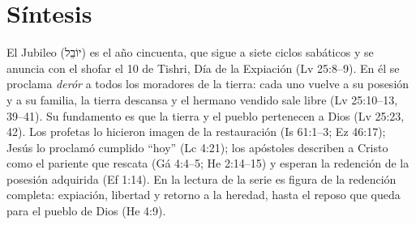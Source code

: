 \documentclass[11pt,letterpaper]{article}
\newcommand{\heb}[1]{\mbox{\foreignlanguage{hebrew}{#1}}}
\begin{document}
\section{Síntesis}

\begin{tcolorbox}[enhanced,unbreakable,colback=papiro,colframe=tierraroja,boxrule=1pt,arc=3pt,title={El Jubileo},fonttitle=\bfseries,coltitle=papiro,colbacktitle=tierraroja]
El Jubileo (\heb{יוֹבֵל}) es el año cincuenta, que sigue a siete ciclos sabáticos y se anuncia con el shofar el 10 de Tishri, Día de la Expiación (Lv 25:8--9). En él se proclama \emph{derór} a todos los moradores de la tierra: cada uno vuelve a su posesión y a su familia, la tierra descansa y el hermano vendido sale libre (Lv 25:10--13, 39--41). Su fundamento es que la tierra y el pueblo pertenecen a Dios (Lv 25:23, 42). Los profetas lo hicieron imagen de la restauración (Is 61:1--3; Ez 46:17); Jesús lo proclamó cumplido ``hoy'' (Lc 4:21); los apóstoles describen a Cristo como el pariente que rescata (Gá 4:4--5; He 2:14--15) y esperan la redención de la posesión adquirida (Ef 1:14). En la lectura de la serie es figura de la redención completa: expiación, libertad y retorno a la heredad, hasta el reposo que queda para el pueblo de Dios (He 4:9).
\end{tcolorbox}
\end{document}
